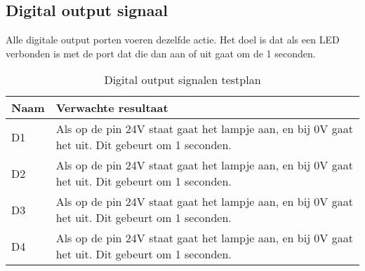 \newpage
\subsection{Digital output signaal} 
Alle digitale output porten voeren dezelfde actie. Het doel is dat als een LED verbonden is met de port dat die dan aan of uit gaat om de 1 seconden.
\begin{table}[h!]
	\caption{Digital output signalen testplan}
	\begin{tabular}{lp{14.5cm}}
	\toprule
	\textbf{Naam} 	& \textbf{Verwachte resultaat} \\ \toprule
	D1	&	Als op de pin 24V staat gaat het lampje aan, en bij 0V gaat het uit. Dit gebeurt om 1 seconden. \\
	D2	&	Als op de pin 24V staat gaat het lampje aan, en bij 0V gaat het uit. Dit gebeurt om 1 seconden. \\
	D3	&	Als op de pin 24V staat gaat het lampje aan, en bij 0V gaat het uit. Dit gebeurt om 1 seconden. \\
	D4	&	Als op de pin 24V staat gaat het lampje aan, en bij 0V gaat het uit. Dit gebeurt om 1 seconden. \\ \bottomrule
	\end{tabular}
	\label{tab:hw_val_dio_testplan}
\end{table}

